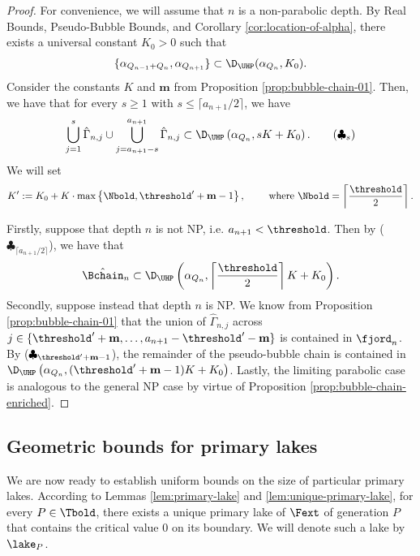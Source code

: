 \documentclass{amsart}
\begin{document}
\begin{proof}
    For convenience, we will assume that $n$ is a non-parabolic depth.
    By Real Bounds, Pseudo-Bubble Bounds, and Corollary \ref{cor:location-of-alpha}, there exists a universal constant $K_0>0$ such that
    \begin{equation}
    \label{eqn:alpha-points-relation}
        \{ \alpha_{Q_{n-1}+Q_n}, \alpha_{Q_{n+1}}\} \subset \D_{\UHP}(\alpha_{Q_n}, K_0).
    \end{equation}
    Consider the constants $K$ and $\mathbf{m}$ from Proposition \ref{prop:bubble-chain-01}.
    Then, we have that for every $s \geq 1$ with $s \leq \lceil a_{n+1}/2\rceil$, we have
    \begin{equation}
        \bigcup_{j=1}^{s} \hat{\Gamma}_{n,j} \cup 
        \bigcup_{j= a_{n+1}-s}^{a_{n+1}} \hat{\Gamma}_{n,j}
        \subset \D_{\UHP} \left(\alpha_{Q_n}, s K + K_0 \right).
        \tag{$\clubsuit_s$}
    \end{equation}
    We will set 
    \[
        K' := K_0 + K \cdot \max\left\{ \Nbold , \threshold'+\mathbf{m}-1 \right\}, \qquad \text{ where } \Nbold  = \left\lceil \frac{\threshold}{2} \right\rceil. 
    \]

    Firstly, suppose that depth $n$ is not NP, i.e. $a_{n+1} < \threshold$.
    Then by ($\clubsuit_{\lceil a_{n+1}/2\rceil}$), we have that 
    \[
        \hat{\Bchain}_n \subset \D_{\UHP}\left( \alpha_{Q_n}, \left\lceil \frac{\threshold}{2} \right\rceil K + K_0 \right).
    \]
    Secondly, suppose instead that depth $n$ is NP.
    We know from Proposition \ref{prop:bubble-chain-01} that the union of $\hat{\Gamma}_{n,j}$ across $j \in \{ \threshold' + \mathbf{m},\ldots, a_{n+1}-\threshold'-\mathbf{m} \}$ is contained in $\fjord_n$.
    By ($\clubsuit_{\threshold'+\mathbf{m}-1}$), the remainder of the pseudo-bubble chain is contained in $\D_{\UHP}\left(\alpha_{Q_n}, (\threshold'+\mathbf{m}-1) K + K_0 \right)$.
    Lastly, the limiting parabolic case is analogous to the general NP case by virtue of Proposition \ref{prop:bubble-chain-enriched}.
\end{proof}

\subsection{Geometric bounds for primary lakes}
\label{ss:lake}

We are now ready to establish uniform bounds on the size of particular primary lakes.
According to Lemmas \ref{lem:primary-lake} and \ref{lem:unique-primary-lake}, for every $P \in \Tbold$, there exists a unique primary lake of $\Fext$ of generation $P$ that contains the critical value $0$ on its boundary.
We will denote such a lake by $\lake_P$.
\end{document}
